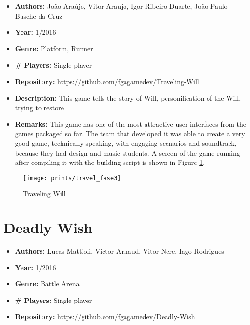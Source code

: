\begin{apendicesenv}
\begin{itemize}
\item[] \textbf{Authors:} Jo\~ao Ara\'ujo, Vitor Araujo, Igor Ribeiro Duarte, Jo\~ao Paulo Busche da Cruz
\item[] \textbf{Year:} 1/2016
\item[] \textbf{Genre:} Platform, Runner
\item[] \textbf{\# Players:} Single player
\item[] \textbf{Repository:} \url{https://github.com/fgagamedev/Traveling-Will}
\item[] \textbf{Description:} This game tells the story of Will, personification of the Will, trying to restore
\item[] \textbf{Remarks:} This game has one of the most attractive user interfaces from the games packaged so far. The team that developed it was able to create a very good game, technically speaking, with engaging scenarios and soundtrack, because they had design and music students. A screen of the game running after compiling it with the building script is shown in Figure \ref{fig:traveling_will}.
\end{itemize}


\begin{figure}[h!]
\centering
\texttt{[image: prints/travel\_fase3]}
\caption{Traveling Will}
\label{fig:traveling_will}
\end{figure}



\section{Deadly Wish}
\label {sec:deadly_wish}

\begin{itemize}
\item[] \textbf{Authors:} Lucas Mattioli, Victor Arnaud, Vitor Nere, Iago Rodrigues
\item[] \textbf{Year:} 1/2016
\item[] \textbf{Genre:} Battle Arena
\item[] \textbf{\# Players:} Single player
\item[] \textbf{Repository:} \url{https://github.com/fgagamedev/Deadly-Wish}

\end{itemize}
\end{apendicesenv}



